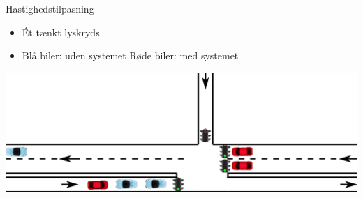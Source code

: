 \begin{frame}{Hastighedstilpasning}
\begin{itemize}
\item Ét tænkt lyskryds
\item Blå biler: uden systemet \hspace{8mm} Røde biler: med systemet
\end{itemize}
\vspace{3mm}
\includegraphics[width=1\textwidth]{images/eks2.png}
\end{frame}

